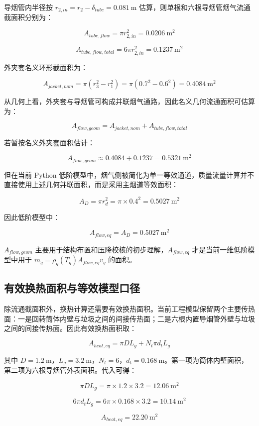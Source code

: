 \documentclass[UTF8,openany,zihao=-4,oneside]{ctexbook}
\begin{document}
导烟管内半径按 \(r_{2,in}=r_2-\delta_{tube}=0.081\ \mathrm{m}\) 估算，则单根和六根导烟管烟气流通截面积分别为：

\[
A_{tube,flow}=\pi r_{2,in}^2=0.0206\ \mathrm{m^2}
\]

\[
A_{tube,flow,total}=6\pi r_{2,in}^2=0.1237\ \mathrm{m^2}
\]

外夹套名义环形截面积为：

\[
A_{jacket,nom}=\pi(r_3^2-r_1^2)=\pi(0.7^2-0.6^2)=0.4084\ \mathrm{m^2}
\]

从几何上看，外夹套与导烟管可构成并联烟气通路，因此名义几何流通面积可估算为：

\[
A_{flow,geom}=A_{jacket,nom}+A_{tube,flow,total}
\]

若暂按名义外夹套面积估计：

\[
A_{flow,geom}\approx0.4084+0.1237=0.5321\ \mathrm{m^2}
\]

但在当前 Python 低阶模型中，烟气侧被简化为单一等效通道，质量流量计算并不直接使用上述几何并联面积，而是采用主烟道等效面积：

\[
A_D=\pi r_d^2=\pi\times0.4^2=0.5027\ \mathrm{m^2}
\]

因此低阶模型中：

\[
A_{flow,eq}=A_D=0.5027\ \mathrm{m^2}
\]

\(A_{flow,geom}\) 主要用于结构布置和压降校核的初步理解，\(A_{flow,eq}\) 才是当前一维低阶模型中用于 \(\dot m_g=\rho_g(T_g)A_{flow,eq}v_g\) 的面积。


\subsection{有效换热面积与等效模型口径}\label{ux6709ux6548ux6362ux70edux9762ux79efux4e0eux7b49ux6548ux6a21ux578bux53e3ux5f84}

除流通截面积外，换热计算还需要有效换热面积。当前工程模型保留两个主要传热面：一是回转筒体内壁与垃圾之间的间接传热面；二是六根内置导烟管外壁与垃圾之间的间接传热面。因此有效换热面积取：

\[
A_{heat,eq}=\pi DL_g+N_t\pi d_tL_g
\]

其中 \(D=1.2\ \mathrm{m}\)，\(L_g=3.2\ \mathrm{m}\)，\(N_t=6\)，\(d_t=0.168\ \mathrm{m}\)。第一项为筒体内壁面积，第二项为六根导烟管外表面积。代入可得：

\[
\pi DL_g=\pi\times1.2\times3.2=12.06\ \mathrm{m^2}
\]

\[
6\pi d_tL_g=6\pi\times0.168\times3.2=10.14\ \mathrm{m^2}
\]

\[
A_{heat,eq}=22.20\ \mathrm{m^2}
\]
\end{document}
